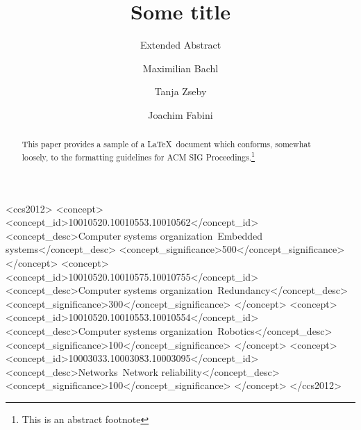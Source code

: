 \documentclass[sigconf]{acmart}
\begin{document}
\title{Some title}
\subtitle{Extended Abstract}

\author{Maximilian Bachl} 

\author{Tanja Zseby} 

\author{Joachim Fabini} 

\renewcommand{\shortauthors}{Bachl, Zseby, Fabini}

\begin{abstract}
This paper provides a sample of a \LaTeX\ document which conforms,
somewhat loosely, to the formatting guidelines for
ACM SIG Proceedings.\footnote{This is an abstract footnote}
\end{abstract}

%
%
\begin{CCSXML}
<ccs2012>
 <concept>
  <concept_id>10010520.10010553.10010562</concept_id>
  <concept_desc>Computer systems organization~Embedded systems</concept_desc>
  <concept_significance>500</concept_significance>
 </concept>
 <concept>
  <concept_id>10010520.10010575.10010755</concept_id>
  <concept_desc>Computer systems organization~Redundancy</concept_desc>
  <concept_significance>300</concept_significance>
 </concept>
 <concept>
  <concept_id>10010520.10010553.10010554</concept_id>
  <concept_desc>Computer systems organization~Robotics</concept_desc>
  <concept_significance>100</concept_significance>
 </concept>
 <concept>
  <concept_id>10003033.10003083.10003095</concept_id>
  <concept_desc>Networks~Network reliability</concept_desc>
  <concept_significance>100</concept_significance>
 </concept>
</ccs2012>  
\end{CCSXML}
\end{document}
